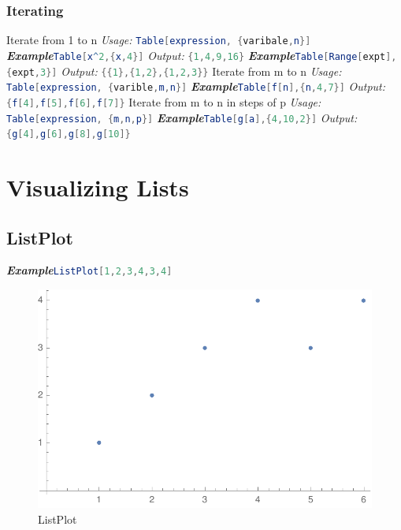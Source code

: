 \documentclass[10pt]{book}
\begin{document}
\subsubsection{Iterating}
\noindent Iterate from 1 to n
\newline
\emph{Usage:} \lstinline[language=Mathematica]|Table[expression, {varibale,n}]|
\newline
\noindent\emph{\textbf{Example}}\quad \lstinline[language=Mathematica]|Table[x^2,{x,4}]| \hspace{\fill}\emph{Output:} \lstinline[language=Mathematica]|{1,4,9,16}|
\newline
\noindent\emph{\textbf{Example}}\quad \lstinline[language=Mathematica]|Table[Range[expt],{expt,3}]| \hspace{\fill}\emph{Output:} \lstinline[language=Mathematica]|{{1},{1,2},{1,2,3}}|
\newline
\newline
\noindent Iterate from m to n
\newline
\emph{Usage:} \lstinline[language=Mathematica]|Table[expression, {varible,m,n}]|
\newline
\noindent\emph{\textbf{Example}}\quad \lstinline[language=Mathematica]|Table[f[n],{n,4,7}]| \hspace{\fill}\emph{Output:} \lstinline[language=Mathematica]|{f[4],f[5],f[6],f[7]}|
\newline
\newline
\noindent Iterate from m to n in steps of p
\emph{Usage:} \lstinline[language=Mathematica]|Table[expression, {m,n,p}]|
\newline
\noindent\emph{\textbf{Example}}\quad \lstinline[language=Mathematica]|Table[g[a],{4,10,2}]| \hspace{\fill}\emph{Output:} \lstinline[language=Mathematica]|{g[4],g[6],g[8],g[10]}|

\section{Visualizing Lists}

\subsection{ListPlot}

\emph{\textbf{Example}}\quad\lstinline[language=Mathematica]|ListPlot[1,2,3,4,3,4]|
\begin{figure}[H]
  \centering
  \includegraphics[width=0.45\linewidth]{figures/ListPlot}
  \caption{ListPlot}
\end{figure}
\end{document}
